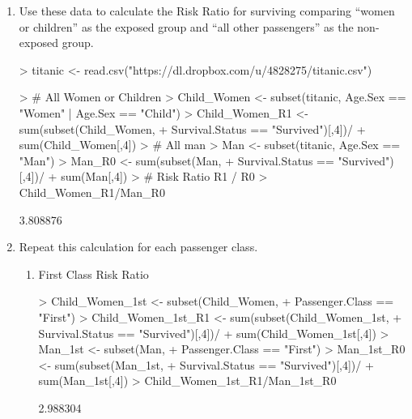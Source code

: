 \documentclass{article}
\begin{document}
\pagebreak
\begin{enumerate}
  \item Use these data to calculate the Risk Ratio for surviving comparing ``women or children'' as the exposed group and ``all other passengers'' as the non-exposed group.

\begin{Schunk}
\begin{Sinput}
> titanic <- read.csv("https://dl.dropbox.com/u/4828275/titanic.csv")
\end{Sinput}
\end{Schunk}

\begin{Schunk}
\begin{Sinput}
> # All Women or Children
> Child_Women <- subset(titanic, Age.Sex == "Women" | Age.Sex == "Child")
> Child_Women_R1 <- sum(subset(Child_Women, 
+                              Survival.Status == "Survived")[,4])/
+                                sum(Child_Women[,4])
> # All man
> Man <- subset(titanic, Age.Sex == "Man")
> Man_R0 <- sum(subset(Man, 
+                      Survival.Status == "Survived")[,4])/
+                        sum(Man[,4])
> # Risk Ratio R1 / R0
> Child_Women_R1/Man_R0
\end{Sinput}
\begin{Soutput}
[1] 3.808876
\end{Soutput}
\end{Schunk}



  \item Repeat this calculation for each passenger class.
\begin{enumerate}
  \item First Class Risk Ratio
  
\begin{Schunk}
\begin{Sinput}
> Child_Women_1st <- subset(Child_Women, 
+                           Passenger.Class == "First")
> Child_Women_1st_R1 <- sum(subset(Child_Women_1st, 
+                                  Survival.Status == "Survived")[,4])/
+                                    sum(Child_Women_1st[,4])
> Man_1st <- subset(Man,
+                   Passenger.Class == "First")
> Man_1st_R0 <- sum(subset(Man_1st,
+                          Survival.Status == "Survived")[,4])/
+                            sum(Man_1st[,4])
> Child_Women_1st_R1/Man_1st_R0
\end{Sinput}
\begin{Soutput}
[1] 2.988304
\end{Soutput}
\end{Schunk}
  

\end{enumerate}
\end{enumerate}
\end{document}
